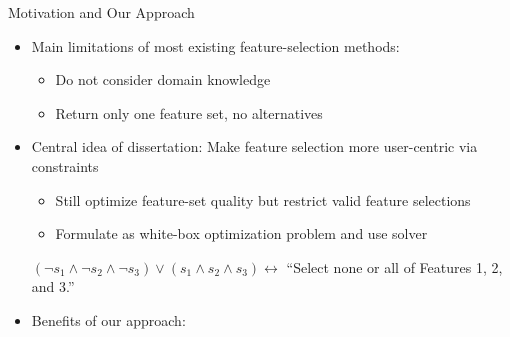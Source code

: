 \documentclass[en, navbarinline, handout]{sdqbeamer}
\begin{document}
\begin{frame}[t]{Motivation and Our Approach}
	\begin{itemize}
		\item Main limitations of most existing feature-selection methods:
		\begin{itemize}
			\item Do not consider domain knowledge
			\item Return only one feature set, no alternatives
		\end{itemize}
		\pause
		\vspace{\baselineskip}
		\item Central idea of dissertation: Make feature selection more user-centric via constraints
		\begin{itemize}
			\item Still optimize feature-set quality but restrict valid feature selections
			\item Formulate as white-box optimization problem and use solver
		\end{itemize}
		\pause
		\begin{example}
			$(\lnot s_1 \land \lnot s_2 \land \lnot s_3) \lor (s_1 \land s_2 \land s_3) \leftrightarrow$ ``Select none or all of Features 1, 2, and 3.''
		\end{example}
		\pause
		\vspace{0.2\baselineskip}
		\item Benefits of our approach:
		\begin{itemize}

\end{itemize}
\end{itemize}
\end{frame}
\end{document}
